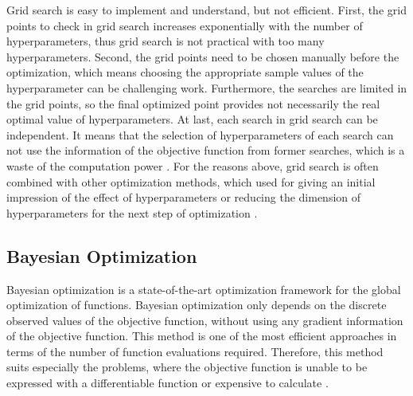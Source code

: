 Grid search is easy to implement and understand, but not efficient. First, the grid points to check in grid search increases exponentially with the number of hyperparameters, thus grid search is not practical with too many hyperparameters. Second, the grid points need to be chosen manually before the optimization, which means choosing the appropriate sample values of the hyperparameter can be challenging work. Furthermore, the searches are limited in the grid points, so the final optimized point provides not necessarily the real optimal value of hyperparameters. At last, each search in grid search can be independent. It means that the selection of hyperparameters of each search can not use the information of the objective function from former searches, which is a waste of the computation power \cite{bergstra2012random}. For the reasons above, grid search is often combined with other optimization methods, which used for giving an initial impression of the effect of hyperparameters or reducing the dimension of hyperparameters for the next step of optimization \cite{ataei2004using}.

\subsection{Bayesian Optimization}
\label{bayopt intro}


Bayesian optimization is a state-of-the-art optimization framework for the global optimization of functions. Bayesian optimization only depends on the discrete observed values of the objective function, without using any gradient information of the objective function. This method is one of the most efficient approaches in terms of the number of function evaluations required. Therefore, this method suits especially the problems, where the objective function is unable to be expressed with a differentiable function or expensive to calculate \cite{brochu2010tutorial}.

